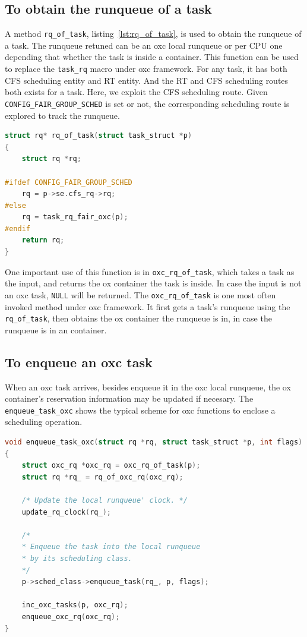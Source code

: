 \subsection{To obtain the runqueue of a task\label{sec:rq_of_task}}
A method \texttt{rq\_of\_task}, listing~\ref{lst:rq_of_task}, is used to 
obtain the runqueue of a task. The runqueue retuned can be an oxc local 
runqueue or per CPU one depending that whether the task is inside a 
container. This function can be used to replace the \texttt{task\_rq} 
macro under oxc framework. For any task, it has both CFS scheduling 
entity and RT entity. And the RT and CFS scheduling routes both exists 
for a task. Here, we exploit the CFS scheduling route. Given 
\texttt{CONFIG\_FAIR\_GROUP\_SCHED} is set or not, the corresponding 
scheduling route is explored to track the runqueue.

\begin{lstlisting}[language=C, 
		caption={Codes to obtain the runqueue of a task},
			label={lst:rq_of_task}]
struct rq* rq_of_task(struct task_struct *p)
{
	struct rq *rq;

#ifdef CONFIG_FAIR_GROUP_SCHED
	rq = p->se.cfs_rq->rq;
#else
	rq = task_rq_fair_oxc(p);
#endif
	return rq;
}
\end{lstlisting}

One important use of this function is in \texttt{oxc\_rq\_of\_task}, 
which takes a task as the input, and returns the ox container the 
task is inside. In case the input is not an oxc task, 
\texttt{NULL} will be returned. The \texttt{oxc\_rq\_of\_task} is 
one most often invoked method under oxc framework. It first gets a 
task's runqueue using the \texttt{rq\_of\_task}, then obtains the ox 
container the runqueue is in, in case the runqueue is in an container.

\subsection{To enqueue an oxc task\label{sec:enqueue_task_oxc}}

When an oxc task arrives, besides enqueue it in the oxc local runqueue,
the ox container's reservation information may be updated if necesary.
The \texttt{enqueue\_task\_oxc} shows the typical scheme for oxc 
functions to enclose a scheduling operation.

\begin{lstlisting}[language=C, 
		caption={To enqueue an task into the oxc local runqueue}]
void enqueue_task_oxc(struct rq *rq, struct task_struct *p, int flags)
{
	struct oxc_rq *oxc_rq = oxc_rq_of_task(p);
	struct rq *rq_ = rq_of_oxc_rq(oxc_rq);

	/* Update the local runqueue' clock. */
	update_rq_clock(rq_);

	/*	
	* Enqueue the task into the local runqueue
	* by its scheduling class.
	*/
	p->sched_class->enqueue_task(rq_, p, flags);

	inc_oxc_tasks(p, oxc_rq);
	enqueue_oxc_rq(oxc_rq);
}
\end{lstlisting}

